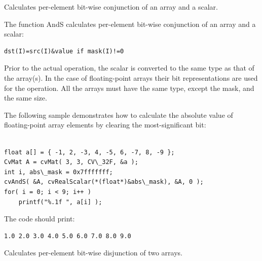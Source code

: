 \label{AndS}

Calculates per-element bit-wise conjunction of an array and a scalar.


\begin{description}
\end{description}

The function AndS calculates per-element bit-wise conjunction of an array and a scalar:

\begin{lstlisting}
dst(I)=src(I)&value if mask(I)!=0
\end{lstlisting}

Prior to the actual operation, the scalar is converted to the same type as that of the array(s). In the case of floating-point arrays their bit representations are used for the operation. All the arrays must have the same type, except the mask, and the same size.

The following sample demonstrates how to calculate the absolute value of floating-point array elements by clearing the most-significant bit:

\begin{lstlisting}

float a[] = { -1, 2, -3, 4, -5, 6, -7, 8, -9 };
CvMat A = cvMat( 3, 3, CV\_32F, &a );
int i, abs\_mask = 0x7fffffff;
cvAndS( &A, cvRealScalar(*(float*)&abs\_mask), &A, 0 );
for( i = 0; i < 9; i++ )
    printf("%.1f ", a[i] );

\end{lstlisting}

The code should print:

\begin{lstlisting}
1.0 2.0 3.0 4.0 5.0 6.0 7.0 8.0 9.0
\end{lstlisting}


\label{Or}

Calculates per-element bit-wise disjunction of two arrays.



